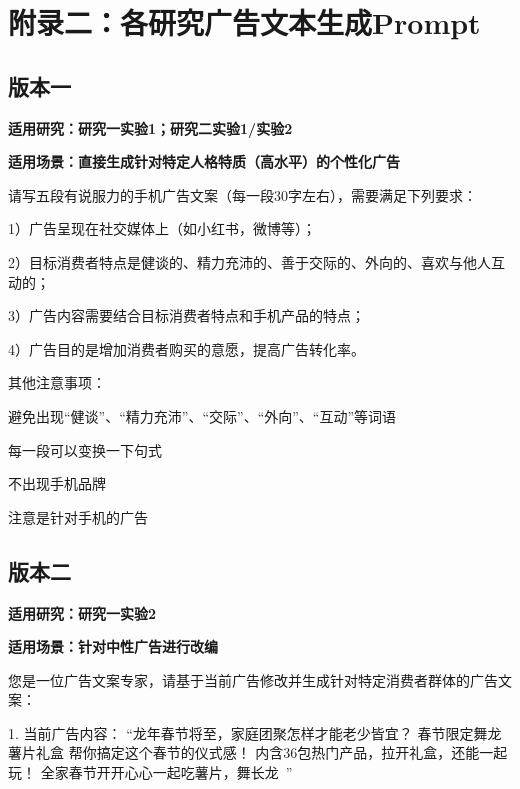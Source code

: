 \section*{附录二：各研究广告文本生成Prompt}

\subsection*{版本一}

\textbf{适用研究：研究一实验1；研究二实验1/实验2}

\textbf{适用场景：直接生成针对特定人格特质（高水平）的个性化广告}

\vspace{1\baselineskip} %

请写五段有说服力的手机广告文案（每一段30字左右），需要满足下列要求：

1）广告呈现在社交媒体上（如小红书，微博等）；

2）目标消费者特点是健谈的、精力充沛的、善于交际的、外向的、喜欢与他人互动的；

3）广告内容需要结合目标消费者特点和手机产品的特点；

4）广告目的是增加消费者购买的意愿，提高广告转化率。

\vspace{1\baselineskip} %

其他注意事项：

避免出现“健谈”、“精力充沛”、“交际”、“外向”、“互动”等词语

每一段可以变换一下句式

不出现手机品牌

注意是针对手机的广告

\subsection*{版本二}

\textbf{适用研究：研究一实验2}

\textbf{适用场景：针对中性广告进行改编}

\vspace{1\baselineskip} %

您是一位广告文案专家，请基于当前广告修改并生成针对特定消费者群体的广告文案：
\vspace{1\baselineskip} %

1. 当前广告内容：
“龙年春节将至，家庭团聚怎样才能老少皆宜？
春节限定舞龙薯片礼盒
帮你搞定这个春节的仪式感！
内含36包热门产品，拉开礼盒，还能一起玩！
全家春节开开心心一起吃薯片，舞长龙~”

